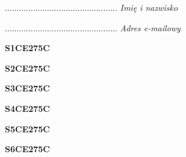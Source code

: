 \begin{turn}{90}\begin{minipage}{\linewidth} \vspace{20mm} ................................................  \textit{Imię i nazwisko}\end{minipage}\end{turn}

\begin{turn}{90}\begin{minipage}{\linewidth} \vspace{20mm} ................................................  \textit{Adres e-mailowy}\end{minipage}\end{turn}

\begin{turn}{90}\huge \begin{minipage}{\linewidth} \vspace{10mm}\textbf{S1CE275C}\end{minipage}\end{turn}

\begin{turn}{90}\huge \begin{minipage}{\linewidth} \vspace{10mm}\textbf{S2CE275C}\end{minipage}\end{turn}

\begin{turn}{90}\huge \begin{minipage}{\linewidth} \vspace{10mm}\textbf{S3CE275C}\end{minipage}\end{turn}

\begin{turn}{90}\huge \begin{minipage}{\linewidth} \vspace{10mm}\textbf{S4CE275C}\end{minipage}\end{turn}

\begin{turn}{90}\huge \begin{minipage}{\linewidth} \vspace{10mm}\textbf{S5CE275C}\end{minipage}\end{turn}

\begin{turn}{90}\huge \begin{minipage}{\linewidth} \vspace{10mm}\textbf{S6CE275C}\end{minipage}\end{turn}

